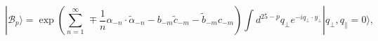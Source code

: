 \begin{equation} \label{eq:GeneralB}
  |\mathcal{B}_p\rangle = \exp \left( \sum_{n = 1}^{\infty}\, \mp
\frac{1}{n} \alpha_{-n}\cdot \tilde{\alpha}_{-n} - b_{-m}
\tilde{c}_{-m} - \tilde{b}_{-m} c_{-m} \right) \int d^{25-p} q_{\bot}
e^{-i q_{\bot}\cdot y_{\bot}} |q_{\bot},q_{\parallel} =0\rangle,
\end{equation}

